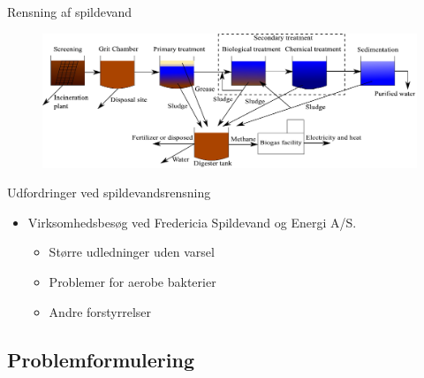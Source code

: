 
\begin{frame}{Rensning af spildevand}{}
\vfill\vfill\centering
\begin{figure}[H]
\centering
\includegraphics[width=1\textwidth,height=0.4\textwidth]{Sections/pictures/WWTP_overview.pdf}
\end{figure}
\vfill\vfill
\end{frame}
%


\begin{frame}{Udfordringer ved spildevandsrensning}{}
\vfill\vfill\centering
\begin{itemize}
	\item<1-> Virksomhedsbesøg ved Fredericia Spildevand og Energi A/S.
	
	\begin{itemize}
		\item<2-> Større udledninger uden varsel
		\vspace{2mm}
		\item<3-> Problemer for aerobe bakterier
		\vspace{2mm}
		\item<4-> Andre forstyrrelser
	\end{itemize}	

\end{itemize}
\vfill\vfill
\end{frame}




\subsection{Problemformulering}

